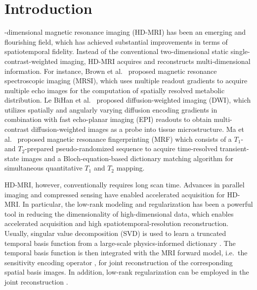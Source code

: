 \documentclass[journal,twoside,web]{ieeecolor}
\begin{document}
	\section{Introduction}
	\label{SEC:INTRO}
	-dimensional magnetic resonance imaging (HD-MRI)
	has been an emerging and flourishing field,
	which has achieved substantial improvements in terms of spatiotemporal fidelity.
	Instead of the conventional two-dimensional static single-contrast-weighted imaging,
	HD-MRI acquires and reconstructs multi-dimensional information.
	For instance, Brown et al.~\cite{brown_1982_mrsi}
	proposed magnetic resonance spectroscopic imaging (MRSI),
	which uses multiple readout gradients to acquire multiple echo images
	for the computation of spatially resolved metabolic distribution.
	Le BiHan et al.~\cite{lebihan_1986_diff} proposed
	diffusion-weighted imaging (DWI),
	which utilizes spatially and angularly varying
	diffusion encoding gradients in combination with
	fast echo-planar imaging (EPI) readouts \cite{mansfield_1977_epi}
	to obtain multi-contrast diffusion-weighted images
	as a probe into tissue microstructure.
	Ma et al.~\cite{ma_2013_mrf} proposed
	magnetic resonance fingerprinting (MRF)
	which consists of a $T_1$- and $T_2$-prepared pseudo-randomized sequence
	to acquire time-resolved transient-state images
	and a Bloch-equation-based dictionary matching algorithm \cite{doneva_2010_moba}
	for simultaneous quantitative $T_1$ and $T_2$ mapping.

	HD-MRI, however, conventionally requires long scan time.
	Advances in parallel imaging
	\cite{roemer_1990_pi,sodickson_1997_smash,
	pruessmann_1999_sense,pruessmann_2001_gsense,griswold_2002_grappa}
	and compressed sensing
	\cite{lustig_2007_cs,block_2007_cs,liang_2007_psf}
	have enabled accelerated acquisition for HD-MRI.
	In particular, the low-rank modeling and regularization \cite{cai_2010_svt}
	has been a powerful tool in reducing the dimensionality of high-dimensional data,
	which enables accelerated acquisition and high spatiotemporal-resolution reconstruction.
	Usually, singular value decomposition (SVD) is used to
	learn a truncated temporal basis function from
	a large-scale physics-informed dictionary
	\cite{huang_2012_t2basis,lam_2014_spice,mcgivney_2014_svdmrf}.
	The temporal basis function is then integrated
	with the MRI forward model,
	i.e.~the sensitivity encoding operator \cite{pruessmann_2001_gsense},
	for joint reconstruction of the corresponding spatial basis images.
	In addition, low-rank regularization can be employed in the joint reconstruction
	\cite{tamir_2017_t2shuffling}.
\end{document}
